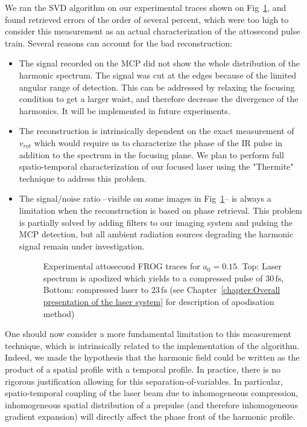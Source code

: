We ran the SVD algorithm on our experimental traces shown on Fig~\ref{fig:effectOgWFR_atfocus_1mJ}, and found retrieved errors of the order of several percent, which were too high to consider this measurement as an actual characterization of the attosecond pulse train. Several reasons can account for the bad reconstruction:


\begin{itemize}
\item The signal recorded on the MCP did not show the whole distribution of the harmonic spectrum. The signal was cut at the edges because of the limited angular range of detection. This can be addressed by relaxing the focusing condition to get a larger waist, and therefore decrease the divergence of the harmonics. It will be implemented  in future experiments.
\item The reconstruction is intrinsically dependent on the exact measurement of $v_{rot}$ which would require us to characterize the phase of the IR pulse in addition to the spectrum in the focusing plane. We plan to perform full spatio-temporal characterization of our focused laser using the "Thermite"~\cite{miranda2014spatiotemporal,pariente2015measuring} technique to address this problem.
\item The signal/noise ratio --visible on some images in Fig~\ref{fig:effectOgWFR_atfocus_1mJ}--  is always a limitation when the reconstruction is based on phase retrieval. This problem is partially solved by adding filters to our imaging system and pulsing the MCP detection, but all ambient radiation sources degrading the harmonic signal remain under investigation.
\begin{figure}[H]
\caption{\label{fig:effectOgWFR_atfocus_1mJ} Experimental attosecond FROG traces for $a_0 = 0.15$. Top: Laser spectrum is apodized which yields to a compressed pulse of $30\,\mathrm{fs}$, Bottom: compressed laser to $23\,\mathrm{fs}$ (see Chapter~\ref{chapter:Overall presentation of the laser system} for description of apodisation method)}
\end{figure}
\end{itemize}




\noindent One should now consider a more fundamental limitation to this measurement technique, which is intrinsically related to the implementation of the algorithm.
Indeed, we made the hypothesis that the harmonic field could be written as the product of a spatial profile with a temporal profile. In practice, there is no rigorous justification allowing for this separation-of-variables. In particular, spatio-temporal coupling of the laser beam due to inhomogeneous compression, inhomogeneous spatial distribution of a prepulse (and therefore inhomogeneous gradient expansion) will directly affect the phase front of the harmonic profile. 

